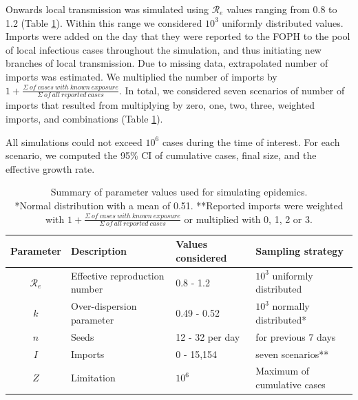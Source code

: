 \documentclass[10pt, a4paper, twoside]{article}
\begin{document}
\begin{multicols}{2}
Onwards local transmission was simulated using $\mathcal{R}_e$ values ranging from 0.8 to 1.2 (Table \ref{t1}).
Within this range we considered $10^3$ uniformly distributed values.
Imports were added on the day that they were reported to the FOPH to the pool of local infectious cases throughout the simulation, and thus initiating new branches of local transmission.
Due to missing data, extrapolated number of imports was estimated.
We multiplied the number of imports by $1+ \frac{\Sigma ~of ~cases ~with ~known ~exposure }{\Sigma ~of ~all ~reported ~cases}$.
In total, we considered seven scenarios of number of imports that resulted from multiplying by zero, one, two, three, weighted imports, and combinations (Table \ref{t1}).

All simulations could not exceed $10^6$ cases during the time of interest.
For each scenario, we computed the 95\% CI of cumulative cases, final size, and the effective growth rate.

\begin{table}[h]
	\centering
\caption{Summary of parameter values used for simulating epidemics.\\*Normal distribution with a mean of 0.51. **Reported imports were weighted with $1+ \frac{\Sigma ~of ~cases ~with ~known ~exposure }{\Sigma ~of ~all ~reported ~cases}$ or multiplied with 0, 1, 2 or 3.}
\label{t1}
\begin{tabular}{clll}
	\hline
	Parameter & Description & Values considered & Sampling strategy\\
	\hline
	$\mathcal{R}_e$ & Effective reproduction number & 0.8 - 1.2 & $10^3$ uniformly distributed\\
	$k$ & Over-dispersion parameter & 0.49 - 0.52 & $10^3$ normally distributed*\\
	$n$ & Seeds & 12 - 32 per day & for previous 7 days\\
	$I$ & Imports & 0 - 15,154 & seven scenarios**\\
	$Z$ & Limitation & $10^6$ & Maximum of cumulative cases\\
	\hline
\end{tabular}
\end{table}


\end{multicols}
\end{document}
